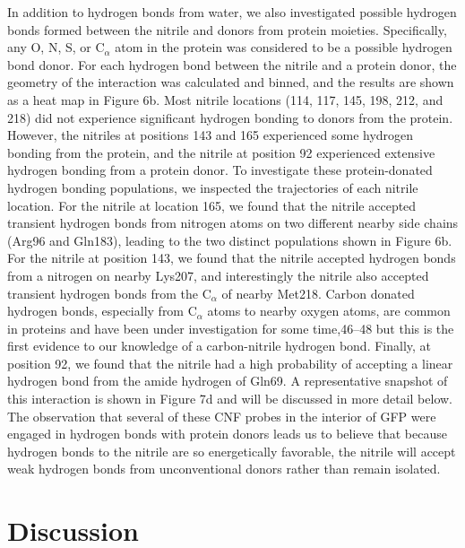 In addition to hydrogen bonds from water, we also investigated possible hydrogen bonds formed between the nitrile and donors from protein moieties.
Specifically, any O, N, S, or C$_{\alpha}$ atom in the protein was considered to be a possible hydrogen bond donor.
For each hydrogen bond between the nitrile and a protein donor, the geometry of the interaction was calculated and binned, and the results are shown as a heat map in Figure 6b.
Most nitrile locations (114, 117, 145, 198, 212, and 218) did not experience significant hydrogen bonding to donors from the protein.
However, the nitriles at positions 143 and 165 experienced some hydrogen bonding from the protein, and the nitrile at position 92 experienced extensive hydrogen bonding from a protein donor.
To investigate these protein-donated hydrogen bonding populations, we inspected the trajectories of each nitrile location.
For the nitrile at location 165, we found that the nitrile accepted transient hydrogen bonds from nitrogen atoms on two different nearby side chains (Arg96 and Gln183), leading to the two distinct populations shown in Figure 6b.
For the nitrile at position 143, we found that the nitrile accepted hydrogen bonds from a nitrogen on nearby Lys207, and interestingly the nitrile also accepted transient hydrogen bonds from the C$_{\alpha}$ of nearby Met218.
Carbon donated hydrogen bonds, especially from C$_{\alpha}$ atoms to nearby oxygen atoms, are common in proteins and have been under investigation for some time,46–48 but this is the first evidence to our knowledge of a carbon-nitrile hydrogen bond.
Finally, at position 92, we found that the nitrile had a high probability of accepting a linear hydrogen bond from the amide hydrogen of Gln69.
A representative snapshot of this interaction is shown in Figure 7d and will be discussed in more detail below.
The observation that several of these CNF probes in the interior of GFP were engaged in hydrogen bonds with protein donors leads us to believe that because hydrogen bonds to the nitrile are so energetically favorable, the nitrile will accept weak hydrogen bonds from unconventional donors rather than remain isolated.  

\section{Discussion}

